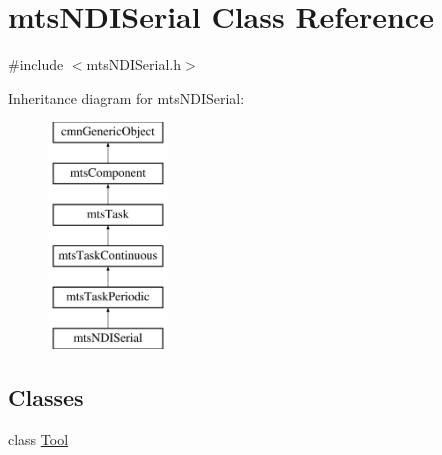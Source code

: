 \hypertarget{classmts_n_d_i_serial}{}\section{mts\+N\+D\+I\+Serial Class Reference}
\label{classmts_n_d_i_serial}


{\ttfamily \#include $<$mts\+N\+D\+I\+Serial.\+h$>$}

Inheritance diagram for mts\+N\+D\+I\+Serial\+:\begin{figure}[H]
\begin{center}
\leavevmode
\includegraphics[height=6.000000cm]{d1/d41/classmts_n_d_i_serial}
\end{center}
\end{figure}
\subsection*{Classes}
\begin{DoxyCompactItemize}
\item 
class \hyperlink{classmts_n_d_i_serial_1_1_tool}{Tool}
\end{DoxyCompactItemize}
